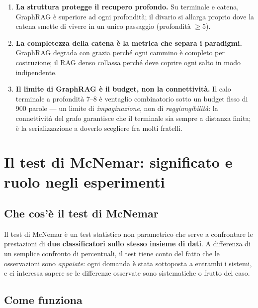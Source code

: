 \documentclass[11pt,a4paper]{report}
\newcommand{\gr}{GraphRAG}
\begin{document}
\begin{enumerate}
  \item \textbf{La struttura protegge il recupero profondo.} Su terminale e catena, \gr{} è
        superiore ad ogni profondità; il divario si allarga proprio dove la catena smette di
        vivere in un unico passaggio (profondità $\geq 5$).
  \item \textbf{La completezza della catena è la metrica che separa i paradigmi.} \gr{}
        degrada con grazia perché ogni cammino è completo per costruzione; il RAG denso
        collassa perché deve coprire ogni salto in modo indipendente.
  \item \textbf{Il limite di \gr{} è il budget, non la connettività.} Il calo terminale a
        profondità 7--8 è ventaglio combinatorio sotto un budget fisso di \num{900} parole
        --- un limite di \emph{impaginazione}, non di \emph{raggiungibilità}: la connettività
        del grafo garantisce che il terminale sia sempre a distanza finita; è la
        serializzazione a doverlo scegliere fra molti fratelli.
\end{enumerate}


\appendix
\chapter{Il test di McNemar: significato e ruolo negli esperimenti}
\label{app:mcnemar}

\section{Che cos'è il test di McNemar}

Il test di McNemar è un test statistico non parametrico che serve a
confrontare le prestazioni di \textbf{due classificatori sullo stesso insieme
di dati}. A differenza di un semplice confronto di percentuali, il test
tiene conto del fatto che le osservazioni sono \emph{appaiate}: ogni domanda
è stata sottoposta a entrambi i sistemi, e ci interessa sapere se le
differenze osservate sono sistematiche o frutto del caso.

\section{Come funziona}
\end{document}
